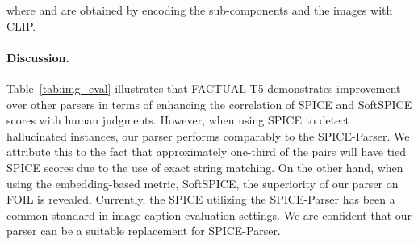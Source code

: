 \noindent
where  and  are obtained by encoding the sub-components and the images with CLIP.

\paragraph{Discussion.} Table~\ref{tab:img_eval} illustrates that FACTUAL-T5 demonstrates improvement over other parsers in terms of enhancing the correlation of SPICE and SoftSPICE scores with human judgments. However, when using SPICE to detect hallucinated instances, our parser performs comparably to the SPICE-Parser. We attribute this to the fact that approximately one-third of the pairs will have tied SPICE scores due to the use of exact string matching. On the other hand, when using the embedding-based metric, SoftSPICE, the superiority of our parser on FOIL is revealed. Currently, the SPICE utilizing the SPICE-Parser has been a common standard in image caption evaluation settings. We are confident that our parser can be a suitable replacement for SPICE-Parser. \begin{table}[t]
\centering
    \caption{ The results comparing SoftSPICE with current SOTA image caption evaluation metrics. We use FACTUAL-T5 as the parser for SoftSPICE. 
     \vspace{-2mm} }
  \label{tab:img_eval_sota}
    \vspace{-3mm}
\end{table}
 
